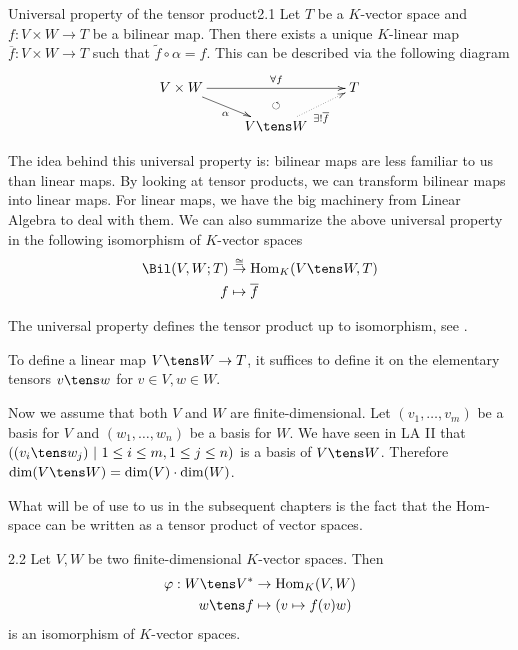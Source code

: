 \documentclass[twoside = false,	%
		headsepline,		%
		parskip = true,
		]{scrbook}						%
\begin{document}
    \begin{proposition}{Universal property of the tensor product}{2.1}
        Let $T$ be a $K$-vector space and $f: V \times W \to T$ be a bilinear map. Then there exists a unique $K$-linear map $\overline{f}: V\times W \to T$ such that $\tilde{f} \circ \alpha = f$. This can be described via the following diagram
        \begin{equation*}
            \xymatrix@R=14pt {
                V \times W \ar[dr]_{\alpha} \ar[rr]^(.55){\forall f} & & T \\
                & V \tens W\ar@{.>}[ur]_{\exists! \bar{f}} \ar@{}[u]|(.55){\circlearrowleft}}
        \end{equation*}
    \end{proposition}
    The idea behind this universal property is: bilinear maps are less familiar to us than linear maps. By looking at tensor products, we can transform bilinear maps into linear maps. For linear maps, we have the big machinery from Linear Algebra to deal with them. We can also summarize the above universal property in the following isomorphism of $K$-vector spaces
    \begin{equation*}
        \begin{split}
            \Bil(V,W;T) &\overset{\cong}{\to} \Hom_K(V \tens W, T) \\
            f &\mapsto \bar{f}            
        \end{split}
      \end{equation*}
    
    \begin{remark*}{}
        The universal property defines the tensor product up to isomorphism, see \cite{LA}.
    \end{remark*}
    
    To define a linear map $V \tens W \to T$, it suffices to define it on the elementary tensors $v \tens w$ for $v \in V,w \in W$.
    
    Now we assume that both $V$ and $W$ are finite-dimensional. Let $(v_1,\dots,v_m)$ be a basis for $V$ and $(w_1,\dots,w_n)$ be a basis for $W$. We have seen in LA II \cite{LA} that $\round{(v_i \tens w_j) \ | \ 1 \leq i \leq m, 1 \leq j \leq n}$ is a basis of $V \tens W$. Therefore $\dim(V \tens W) = \dim(V) \cdot \dim(W)$.
    
    What will be of use to us in the subsequent chapters is the fact that the Hom-space can be written as a tensor product of vector spaces.
    
    \begin{proposition}{}{2.2}
        Let $V, W$ be two finite-dimensional $K$-vector spaces. Then
        \begin{equation*}
        \begin{split}
            \varphi: W \tens V^* &\to \Hom_K(V,W) \\
            w \tens f &\mapsto (v \mapsto f(v)w )    
        \end{split}
        \end{equation*}
        is an isomorphism of $K$-vector spaces.
    \end{proposition}
    
\end{document}
